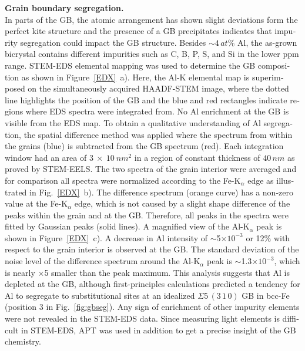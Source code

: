 \documentclass[12pt,a4paper,twoside,twocolumn,english,english]{article}
\begin{document}
\begin{otherlanguage}{english}
\noindent
\textbf{Grain boundary segregation.}\\
In parts of the GB, the atomic arrangement has shown slight deviations form the perfect kite structure and the presence of a GB precipitates indicates that impurity segregation could impact the GB structure. Besides $\sim4\,at\%$ Al, the as-grown bicrystal contains different impurities such as C, B, P, S, and Si in the lower ppm range. STEM-EDS elemental mapping was used to determine the GB composition as shown in Figure~\ref{EDX}~a). Here, the Al-K elemental map is superimposed on the simultaneously acquired HAADF-STEM image, where the dotted line highlights the position of the GB and the blue and red rectangles indicate regions where EDS spectra were integrated from. No Al enrichment at the GB is visible from the EDS map. To obtain a qualitative understanding of Al segregation, the spatial difference method was applied where the spectrum from within the grains (blue) is subtracted from the GB spectrum (red). Each integration window had an area of $3~\times~10~\unit{nm^2}$ in a region of constant thickness of $40\,nm$ as proved by STEM-EELS. The two spectra of the grain interior were averaged and for comparison all spectra were normalized according to the Fe-K$_{\alpha}$ edge as illustrated in Fig.~\ref{EDX}~b). The difference spectrum (orange curve) has a non-zero value at the Fe-K$_\alpha$ edge, which is not caused by a slight shape difference of the peaks within the grain and at the GB. Therefore, all peaks  in the spectra were fitted by Gaussian peaks (solid lines). A magnified view of the Al-K$_\alpha$ peak is shown in Figure~\ref{EDX}~c). A decrease in Al intensity of $\sim$5$\times10^{-3}$ or 12\% with respect to the grain interior is observed at the GB. The standard deviation of the noise level of the difference spectrum around the Al-K$_\alpha$ peak is $\sim$1.3$\times10^{-3}$, which is nearly $\times$5 smaller than the peak maximum. This analysis suggests that Al is depleted at the GB, although first-principles calculations predicted a tendency for Al to segregate to substitutional sites at an idealized $\Sigma 5\,(3\,1\,0)$ GB in bcc-Fe (position $3$ in Fig.~\ref{fig:gbseg}). Any sign of enrichment of other impurity elements were not revealed in the STEM-EDS data. Since measuring light elements is difficult in STEM-EDS, APT was used in addition to get a precise insight of the GB chemistry.\\


\end{otherlanguage}
\end{document}
